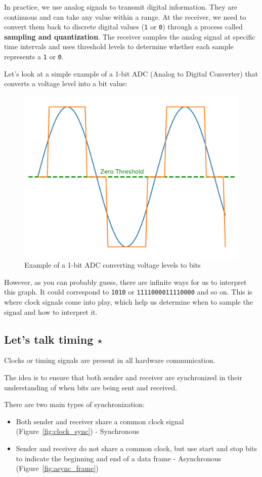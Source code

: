 In practice, we use analog signals to transmit digital information. They are continuous and can take any value within a range. At the receiver, we need to convert them back to discrete digital values (\texttt{1} or \texttt{0}) through a process called \textbf{sampling and quantization}. The receiver samples the analog signal at specific time intervals and uses threshold levels to determine whether each sample represents a \texttt{1} or \texttt{0}.

\newpage
Let's look at a simple example of a 1-bit ADC (Analog to Digital Converter) that converts a voltage level into a bit value:

\begin{figure}[h]
    \centering
    \includegraphics[width=.5\textwidth]{assets/osi/physical/adc_plot.png}
    \caption{Example of a 1-bit ADC converting voltage levels to bits}\label{fig:adc_plot}
\end{figure}

However, as you can probably guess, there are infinite ways for us to interpret this graph. It could correspond to \texttt{1010} or \texttt{1111000011110000} and so on. 
This is where clock signals come into play, which help us determine when to sample the signal and how to interpret it.

\subsection*{Let's talk timing $\star$}
Clocks or timing signals are present in all hardware communication. 

The idea is to ensure that both sender and receiver are synchronized in their understanding of when bits are being sent and received. 


There are two main types of synchronization:
\begin{itemize}
    \item Both sender and receiver share a common clock signal (Figure~\ref{fig:clock_sync}) - Synchronous 
    \item Sender and receiver do not share a common clock, but use start and stop bits to indicate the beginning and end of a data frame - Asynchronous (Figure~\ref{fig:async_frame})
\end{itemize}

